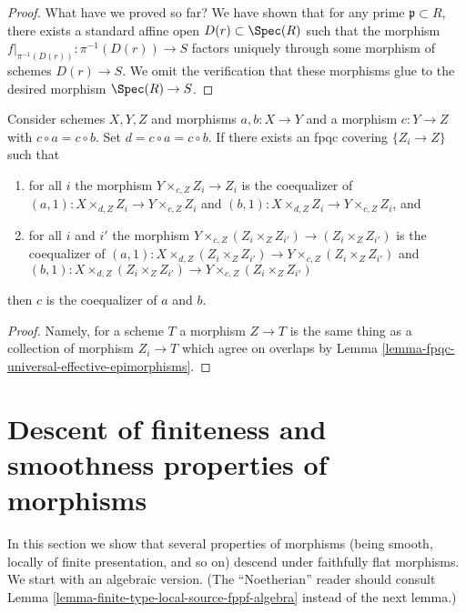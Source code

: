 \begin{proof}
\medskip\noindent
What have we proved so far? We have shown that for any prime
$\mathfrak p \subset R$, there exists a standard affine open
$D(r) \subset \Spec(R)$ such that the morphism
$f|_{\pi^{-1}(D(r))} : \pi^{-1}(D(r)) \to S$ factors uniquely
through some morphism of schemes $D(r) \to S$. We omit the
verification that these morphisms glue to the desired
morphism $\Spec(R) \to S$.
\end{proof}

\begin{lemma}
\label{lemma-coequalizer-fpqc-local}
Consider schemes $X, Y, Z$ and morphisms $a, b : X \to Y$ and
a morphism $c : Y \to Z$ with $c \circ a = c \circ b$. Set
$d = c \circ a = c \circ b$. If there exists an
fpqc covering $\{Z_i \to Z\}$ such that
\begin{enumerate}
\item for all $i$ the morphism $Y \times_{c, Z} Z_i \to Z_i$
is the coequalizer of $(a, 1) : X \times_{d, Z} Z_i \to Y \times_{c, Z} Z_i$
and $(b, 1) : X \times_{d, Z} Z_i \to Y \times_{c, Z} Z_i$, and
\item for all $i$ and $i'$ the morphism
$Y \times_{c, Z} (Z_i \times_Z Z_{i'}) \to (Z_i \times_Z Z_{i'})$
is the coequalizer of
$(a, 1) : X \times_{d, Z} (Z_i \times_Z Z_{i'}) \to
Y \times_{c, Z} (Z_i \times_Z Z_{i'})$ and
$(b, 1) : X \times_{d, Z} (Z_i \times_Z Z_{i'}) \to
Y \times_{c, Z} (Z_i \times_Z Z_{i'})$
\end{enumerate}
then $c$ is the coequalizer of $a$ and $b$.
\end{lemma}

\begin{proof}
Namely, for a scheme $T$ a morphism $Z \to T$ is the same thing as
a collection of morphism $Z_i \to T$ which agree on overlaps by
Lemma \ref{lemma-fpqc-universal-effective-epimorphisms}.
\end{proof}















\section{Descent of finiteness and smoothness properties of morphisms}
\label{section-descent-finiteness-morphisms}

\noindent
In this section we show that several properties
of morphisms (being smooth, locally of finite presentation,
and so on) descend under faithfully flat morphisms. We start
with an algebraic version. (The ``Noetherian'' reader should
consult Lemma \ref{lemma-finite-type-local-source-fppf-algebra}
instead of the next lemma.)

